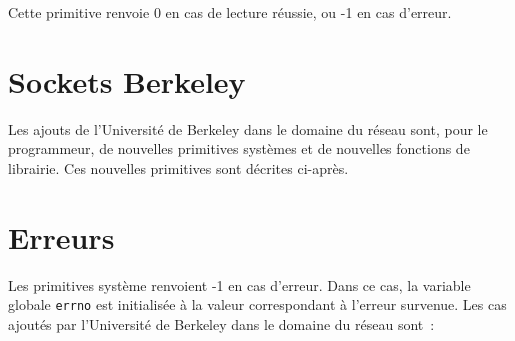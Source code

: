 \documentclass [twoside] {report}
\begin{document}
Cette primitive renvoie 0 en cas de lecture
réussie, ou -1 en cas d'erreur.



\section {Sockets Berkeley}

Les ajouts de l'Université de Berkeley dans le domaine du
réseau sont, pour le programmeur, de nouvelles primitives
systèmes et de nouvelles fonctions de librairie. Ces nouvelles
primitives sont décrites ci-après.

\section* {Erreurs}

Les primitives système renvoient -1 en cas d'erreur. Dans ce
cas, la variable globale {\tt errno} est initialisée à la
valeur correspondant à l'erreur survenue. Les cas ajoutés
par l'Université de Berkeley dans le domaine du réseau sont~:
\end{document}
